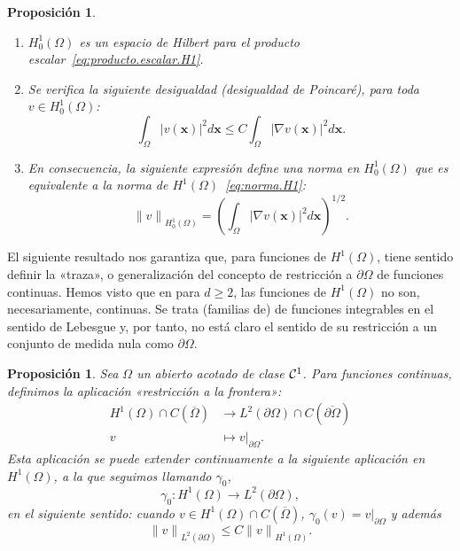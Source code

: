 \documentclass[11pt]{report}
\theoremstyle{plain}
\newtheorem{proposition}[theorem]{Proposición}
\theoremstyle{definition}
\newcommand{\xx}{\ensuremath{\mathbf{x}}\xspace}
\newcommand{\grad}{\ensuremath{\nabla}}
\newcommand{\norm}[1]{\ensuremath{\|#1\|}}
\newcommand{\classC}[2]{%
  \ensuremath{
   \ifthenelse{\equal{#2}{}}
    {\mathcal{C}^{#1}}
    {\mathcal{C}^{#1}(#2)}
  }
}
\begin{document}
\begin{proposition}~
  \begin{enumerate}
    \item
  $H_0^1(\Omega)$ es un espacio de Hilbert para el producto escalar~\eqref{eq:producto.escalar.H1}. 
\item Se verifica la siguiente desigualdad (desigualdad de Poincaré), para toda $v\in H_0^1(\Omega)$:
  \begin{equation}
    \label{eq:desigualdad.Poincare}
    \int_\Omega \left| v(\xx)\right|^2 d\xx \le 
    C \int_\Omega \left|\grad v(\xx)\right|^2 d\xx.
  \end{equation}
\item En consecuencia, la siguiente expresión define una norma en $H_0^1(\Omega)$ que es equivalente a la norma de $H^1(\Omega)$~\eqref{eq:norma.H1}:
  \begin{equation} 
    \norm{v}_{H_0^1(\Omega)} =  \left(\int_\Omega \left|\grad v(\xx)\right|^2 d\xx\right)^{1/2}.
  \end{equation}
\end{enumerate}
\end{proposition}

El siguiente resultado nos garantiza que, para funciones de $H^1(\Omega)$, tiene sentido definir la «traza», o generalización del concepto de restricción a $\partial\Omega$ de funciones continuas. 
Hemos visto que en para $d\ge 2$, las funciones de $H^1(\Omega)$ no son, necesariamente, continuas. Se trata (familias de) de funciones integrables en el sentido de Lebesgue y, por tanto, no está claro el sentido de su restricción a un conjunto de medida nula como $\partial\Omega$.

\begin{proposition}
  Sea $\Omega$ un abierto acotado de clase $\classC1{}$. Para funciones continuas, definimos la aplicación «restricción a la frontera»:
  \begin{align*}
    H^1(\Omega)\cap C(\overline\Omega) & \to 
    L^2(\partial\Omega)\cap C(\overline{\partial\Omega})
    \\
    v &\mapsto  v|_{\partial\Omega}.
  \end{align*}
Esta aplicación se puede extender continuamente a la siguiente aplicación en $H^1(\Omega)$, a la que seguimos llamando $\gamma_0$,
  \begin{displaymath}
    \gamma_0: H^1(\Omega)\to L^2(\partial\Omega),
  \end{displaymath}
  en el siguiente sentido: cuando $v\in H^1(\Omega)\cap C(\overline\Omega)$, $\gamma_0(v) = v|_{\partial\Omega}$ y además
 \begin{displaymath}
   \norm{v}_{L^2(\partial\Omega)} \le C \norm{v}_{H^1(\Omega)}.
 \end{displaymath}
\end{proposition}
\end{document}
